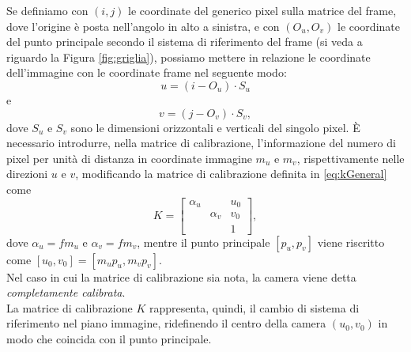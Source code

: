  Se definiamo con $(i,j)$ le coordinate del generico pixel sulla matrice del frame, dove l'origine \`e posta nell'angolo in alto a sinistra, e con $(O_u, O_v)$ le coordinate del punto principale secondo il sistema di riferimento del frame (si veda a riguardo la Figura \ref{fig:griglia}), possiamo mettere in relazione le coordinate dell'immagine con le coordinate frame nel seguente modo:
 \[ u = (i - O_u) \cdot S_u \]
 e
 \[ v = (j - O_v) \cdot S_v, \]
 dove $S_u$ e $S_v$ sono le dimensioni orizzontali e verticali del singolo pixel.
 \`E necessario introdurre, nella matrice di calibrazione, l'informazione del numero di pixel per unit\`a di distanza in coordinate immagine $m_u$ e $m_v$, rispettivamente nelle direzioni $u$ e $v$, modificando la matrice di calibrazione definita in \eqref{eq:kGeneral} come
 \begin{equation}
 \label{eq:kDigital}
 K =
 \left[\begin{array}{rccl}
 \alpha_u & & u_0\\
 & \alpha_v & v_0\\
 & & 1
 \end{array}\right],
 \end{equation}
 dove $\alpha_u = fm_u$ e $\alpha_v=fm_v$, mentre il punto principale $[p_u, p_v]$ viene riscritto come $[u_0, v_0] = [m_u p_u, m_v p_v]$. \\
 Nel caso in cui la matrice di calibrazione sia nota, la camera viene detta \textit{completamente calibrata}.\\
 La matrice di calibrazione $K$ rappresenta, quindi, il cambio di sistema di riferimento nel piano immagine, ridefinendo il centro della camera $(u_0, v_0)$ in modo che coincida con il punto principale.

